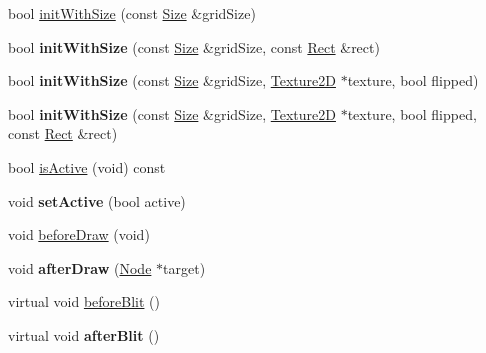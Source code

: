\textbf{ }\par
\begin{DoxyCompactItemize}
\item 
bool \hyperlink{classGridBase_a6954ba2038e8b821dbdf58c958b5f175}{init\+With\+Size} (const \hyperlink{classSize}{Size} \&grid\+Size)
\item 
\mbox{\label{classGridBase_adecb551bd76a4fcf8515bb27c999ccac}} 
bool {\bfseries init\+With\+Size} (const \hyperlink{classSize}{Size} \&grid\+Size, const \hyperlink{classRect}{Rect} \&rect)
\item 
\mbox{\label{classGridBase_a1cb52b35b7144f88ce0d511c671ff645}} 
bool {\bfseries init\+With\+Size} (const \hyperlink{classSize}{Size} \&grid\+Size, \hyperlink{classTexture2D}{Texture2D} $\ast$texture, bool flipped)
\item 
\mbox{\label{classGridBase_adacfc703d86cdd323253fab2e94b6dbe}} 
bool {\bfseries init\+With\+Size} (const \hyperlink{classSize}{Size} \&grid\+Size, \hyperlink{classTexture2D}{Texture2D} $\ast$texture, bool flipped, const \hyperlink{classRect}{Rect} \&rect)
\end{DoxyCompactItemize}

\textbf{ }\par
\begin{DoxyCompactItemize}
\item 
bool \hyperlink{classGridBase_aba600e6b3b23bd45d07652a0b63c7a46}{is\+Active} (void) const
\item 
\mbox{\label{classGridBase_ab088275c2f3b49e29d1b103ce80709a7}} 
void {\bfseries set\+Active} (bool active)
\end{DoxyCompactItemize}

\textbf{ }\par
\begin{DoxyCompactItemize}
\item 
void \hyperlink{classGridBase_a975ccffbff789ff39092cb9dceb99657}{before\+Draw} (void)
\item 
\mbox{\label{classGridBase_a3dfda94249531459f40976c69f186150}} 
void {\bfseries after\+Draw} (\hyperlink{classNode}{Node} $\ast$target)
\end{DoxyCompactItemize}

\textbf{ }\par
\begin{DoxyCompactItemize}
\item 
virtual void \hyperlink{classGridBase_a04ceef221be29f561d00bd10ae7dc13a}{before\+Blit} ()
\item 
\mbox{\label{classGridBase_abf100b0b02564350a8ae0c2170094812}} 
virtual void {\bfseries after\+Blit} ()
\end{DoxyCompactItemize}


